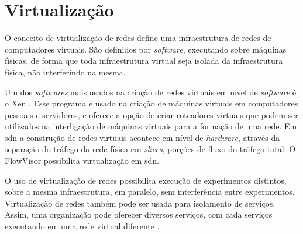 \section{Virtualização}
\label{sec:virtualizacao}

O conceito de virtualização de redes define uma infraestrutura de redes de computadores virtuais. São definidos por \textit{software}, executando sobre máquinas físicas, de forma que toda infraestrutura virtual seja isolada da infraestrutura física, não interferindo na mesma. 

Um dos \textit{softwares} mais usados na criação de redes virtuais em nível de \textit{software} é o Xen \cite{Fernandes:2011}. Esse programa é usado na criação de máquinas virtuais em computadores pessoais e servidores, e oferece a opção de criar roteadores virtuais que podem ser utilizados na interligação de máquinas virtuais para a formação de uma rede. Em \gls{sdn} a construção de redes virtuais acontece em nível de \textit{hardware}, através da separação do tráfego da rede física em \textit{slices}, porções de fluxo do tráfego total. O FlowVisor \cite{Sherwood:2009} possibilita virtualização em \gls{sdn}.

O uso de virtualização de redes possibilita execução de experimentos distintos, sobre a mesma infraestrutura, em paralelo, sem interferência entre experimentos. Virtualização de redes também pode ser usada para isolamento de serviços. Assim, uma organização pode oferecer diversos serviços, com cada serviços executando em uma rede virtual diferente \cite{wu:2010, Mattos:2012}.
